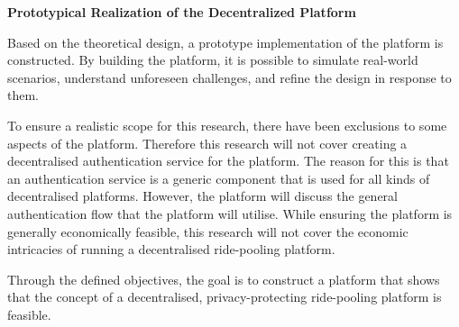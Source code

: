 \textbf{Prototypical Realization of the Decentralized Platform}

Based on the theoretical design, a prototype implementation of the platform is constructed. By building the platform,  it is possible to simulate real-world scenarios, understand unforeseen challenges, and refine the design in response to them.

To ensure a realistic scope for this research, there have been exclusions to some aspects of the platform. Therefore this research will not cover creating a decentralised authentication service for the platform. The reason for this is that an authentication service is a generic component that is used for all kinds of decentralised platforms. However, the platform will discuss the general authentication flow that the platform will utilise. While ensuring the platform is generally economically feasible, this research will not cover the economic intricacies of running a decentralised ride-pooling platform.

 Through the defined objectives, the goal is to construct a platform that shows that the concept of a decentralised, privacy-protecting ride-pooling platform is feasible.